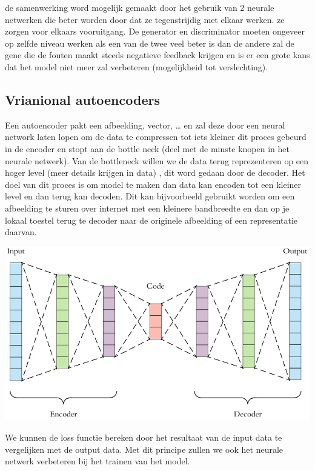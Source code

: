 \documentclass[12pt]{article}
\begin{document}
\bigskip
de samenwerking word mogelijk gemaakt door het gebruik van 2 neurale netwerken die beter worden door dat ze tegenstrijdig
met elkaar werken. ze zorgen voor elkaars vooruitgang. De generator en discriminator moeten ongeveer op zelfde niveau werken als een
van de twee veel beter is dan de andere zal de gene die de fouten maakt steeds negatieve feedback
krijgen en is er een grote kans dat het model niet meer zal verbeteren (mogelijkheid tot verslechting).
\autocite{Weng2017}

\subsection{Vrianional autoencoders}
Een autoencoder pakt een afbeelding, vector, … en zal deze door een neural network laten lopen om de data
te compressen tot iets kleiner dit proces gebeurd in de encoder en stopt aan de bottle neck
(deel met de minste knopen in het neurale netwerk). Van de bottleneck willen we de data terug reprezenteren
op een hoger level (meer details krijgen in data) , dit word gedaan door de decoder. Het doel van dit
proces is om model te maken dan data kan encoden tot een kleiner level en dan terug kan decoden. Dit kan
bijvoorbeeld gebruikt worden om een afbeelding te sturen over internet met een kleinere bandbreedte en dan
op je lokaal toestel terug te decoder naar de originele afbeelding of een representatie daarvan.


\begin{center}
    \includegraphics[width=1\columnwidth]{autoencoder.png}
\end{center}

\bigskip
We kunnen de loss functie bereken door het resultaat van de input data te vergelijken met de output data.
Met dit principe zullen we ook het neurale netwerk verbeteren bij het trainen van het model.
\end{document}
